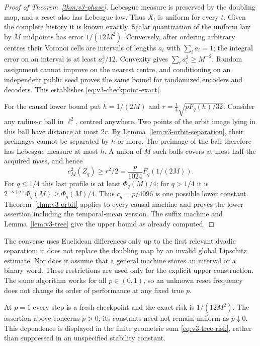 \begin{proof}[Proof of Theorem~\ref{thm:v3-phase}]
Lebesgue measure is preserved by the doubling map, and a reset also has
Lebesgue law. Thus $X_t$ is uniform for every $t$. Given the complete
history it is known exactly. Scalar quantization of the uniform law by
$M$ midpoints has error $1/(12M^2)$. Conversely, after ordering arbitrary
centres their Voronoi cells are intervals of lengths $a_i$ with
$\sum_i a_i=1$; the integral error on an interval is at least $a_i^3/12$.
Convexity gives $\sum_i a_i^3\ge M^{-2}$. Random assignment cannot
improve on the nearest centre, and conditioning on an independent public
seed proves the same bound for randomized encoders and decoders.
This establishes \eqref{eq:v3-checkpoint-exact}.

For the causal lower bound put $h=1/(2M)$ and
$r=\tfrac14\sqrt{pF_q(h)/32}$. Consider any radius-$r$ ball in
$\ell^2$, centred anywhere. Two points of the orbit image lying in this
ball have distance at most $2r$. By
Lemma~\ref{lem:v3-orbit-separation}, their preimages cannot be separated
by $h$ or more. The preimage of the ball therefore has Lebesgue measure
at most $h$. A union of $M$ such balls covers at most half the acquired
mass, and hence
\[
 e_M^2(Z_q)\ge r^2/2=\frac p{1024}F_q(1/(2M)).
\]
For $q\le1/4$ this last profile is at least $\Phi_q(M)/4$;
for $q>1/4$ it is $2^{-\kappa(q)}\Phi_q(M)\ge\Phi_q(M)/4$.
Thus $c_q=p/4096$ is one possible lower constant.
Theorem~\ref{thm:v3-orbit} applies to every causal machine and proves
the lower assertion including the temporal-mean version. The suffix
machine and Lemma~\ref{lem:v3-tree} give the upper bound as already
computed.
\end{proof}

The converse uses Euclidean differences only up to the first relevant
dyadic separation; it does not replace the doubling map by an invalid
global Lipschitz estimate. Nor does it assume that a general machine
stores an interval or a binary word. These restrictions are used only
for the explicit upper construction. The same algorithm works for all
$p\in(0,1)$, so an unknown reset frequency does not change its order of
performance at any fixed true $p$.

At $p=1$ every step is a fresh checkpoint and the exact risk is
$1/(12M^2)$. The assertion above concerns $p>0$; its constants need not
remain uniform as $p\downarrow0$. This dependence is displayed in the
finite geometric sum \eqref{eq:v3-tree-risk}, rather than suppressed in
an unspecified stability constant.
